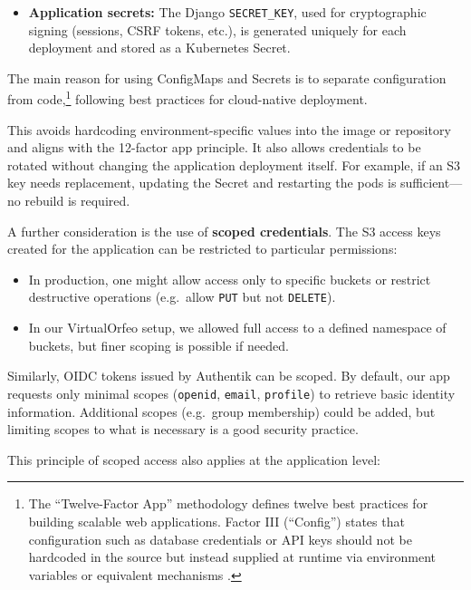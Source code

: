 \begin{itemize}
	\item \textbf{Application secrets:}  
	The Django \texttt{SECRET\_KEY}, used for cryptographic signing (sessions, CSRF tokens, etc.), is generated uniquely for each deployment and stored as a Kubernetes Secret.  
\end{itemize}

\medskip

The main reason for using ConfigMaps and Secrets is to separate configuration from code,\footnote{The “Twelve-Factor App” methodology defines twelve best practices for building scalable web applications. Factor III (“Config”) states that configuration such as database credentials or API keys should not be hardcoded in the source but instead supplied at runtime via environment variables or equivalent mechanisms \parencite{Wiggins2011TwelveFactor}.} following best practices for cloud-native deployment.

This avoids hardcoding environment-specific values into the image or repository and aligns with the 12-factor app principle. It also allows credentials to be rotated without changing the application deployment itself. For example, if an S3 key needs replacement, updating the Secret and restarting the pods is sufficient—no rebuild is required.

\medskip

A further consideration is the use of \textbf{scoped credentials}. The S3 access keys created for the application can be restricted to particular permissions:  

\begin{itemize}
	\item In production, one might allow access only to specific buckets or restrict destructive operations (e.g.\ allow \texttt{PUT} but not \texttt{DELETE}).  
	\item In our VirtualOrfeo setup, we allowed full access to a defined namespace of buckets, but finer scoping is possible if needed.  
\end{itemize}

Similarly, OIDC tokens issued by Authentik can be scoped. By default, our app requests only minimal scopes (\texttt{openid}, \texttt{email}, \texttt{profile}) to retrieve basic identity information. Additional scopes (e.g.\ group membership) could be added, but limiting scopes to what is necessary is a good security practice.

\medskip

This principle of scoped access also applies at the application level:  

